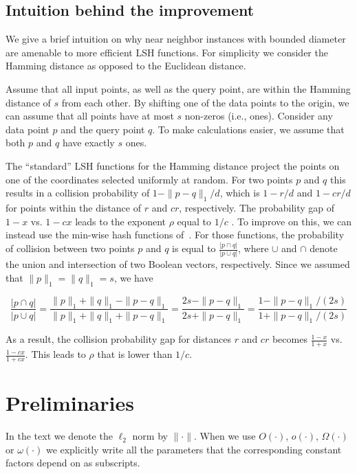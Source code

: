 \documentclass[11pt,letterpaper]{article}
\begin{document}
\subsection{Intuition behind the improvement}
\label{ss:int}
We give a brief intuition on why near neighbor instances with bounded diameter are amenable to more efficient LSH functions. 
For simplicity we consider the Hamming distance  as opposed to the Euclidean distance.  

Assume that all input points, as well as the query point, are within the Hamming distance of $s$ from each other. 
By shifting one of the data points to the origin, we can assume that all points have at most $s$ non-zeros (i.e., ones). Consider any data point $p$ and the query point $q$. To make calculations easier, we assume that both $p$ and $q$ have exactly $s$ ones.

The ``standard'' LSH functions for the Hamming distance project the points on one of the coordinates selected uniformly at random. 
For two points $p$ and $q$ this results in a collision probability of $1-\|p-q\|_1/d$, which is $1-r/d$ and $1-cr/d$ for points within the distance of $r$ and $cr$, respectively. The probability gap of $1-x$ vs. $1-cx$ leads to the exponent $\rho$ equal to $1/c$ \cite{im-anntr-98}. To improve on this, we can instead use the min-wise hash functions of~\cite{b-fndd-98}. For those functions, the probability of collision between two points $p$ and $q$ is equal to $\frac{|p\cap q|}{|p \cup q|} $, where $\cup$ and $\cap$ denote the union and intersection of two Boolean vectors, respectively. 
Since we assumed that $\|p\|_1=\|q\|_1=s$, we have

$$\frac{|p\cap q|}{|p \cup q|} = \frac{\|p\|_1 + \|q\|_1 - \|p-q\|_1}{\|p\|_1+\|q\|_1 + \|p-q\|_1} = \frac{2s- \|p-q\|_1}{2s+\|p-q\|_1}
= \frac{1-\|p-q\|_1/(2s)}{1+ \|p-q\|_1/(2s)} $$

As a result, the collision probability gap for distances $r$ and $cr$ becomes $\frac{1-x}{1+x}$ vs. $\frac{1-cx}{1+cx}$. This leads to $\rho$ that is lower than $1/c$.  





\section{Preliminaries}

In the text we denote the $\ell_2$ norm by $\| \cdot \|$. When we use $O(\cdot)$, $o(\cdot)$,
$\Omega(\cdot)$ or $\omega(\cdot)$ we explicitly write all the parameters that the corresponding constant factors
depend on as subscripts.
\end{document}
